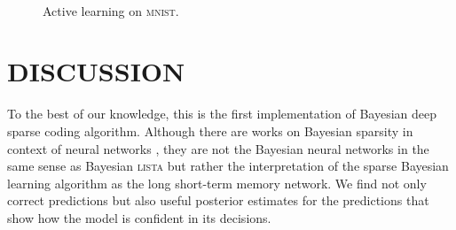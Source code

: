 \documentclass[letterpaper]{article}
\begin{document}
\begin{figure}[t]
 \\
\caption{Active learning on \textsc{mnist}.}
\label{fig:active_learning_mnist}
\end{figure}

\section{\uppercase{Discussion}}
\label{sec:discussion}
To the best of our knowledge, this is the first implementation of Bayesian deep sparse coding algorithm. Although there are works on Bayesian sparsity in context of neural networks \citep{he2017bayesian}, they are not the Bayesian neural networks in the same sense as Bayesian \textsc{lista} but rather the interpretation of the sparse Bayesian  learning algorithm as the long short-term memory network. We find not only correct predictions but also useful posterior estimates for the predictions that show how the model is confident in its decisions. 
\end{document}

